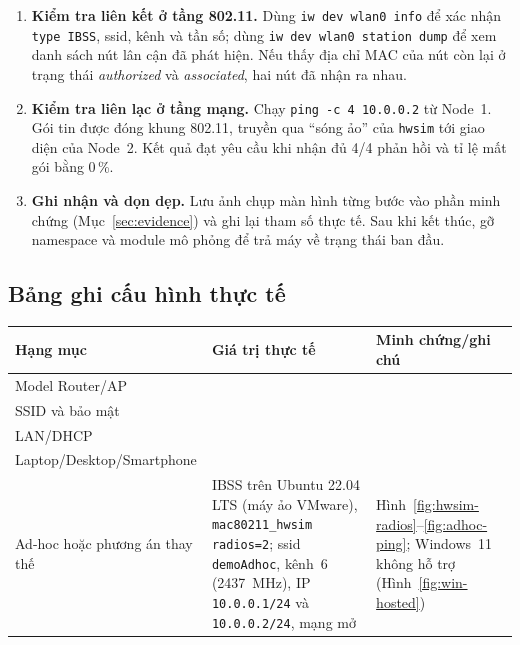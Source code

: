 \begin{enumerate}[leftmargin=*]
  \item \textbf{Kiểm tra liên kết ở tầng 802.11.} Dùng
    \texttt{iw dev wlan0 info} để xác nhận \texttt{type IBSS}, \ac{ssid},
    kênh và tần số; dùng \texttt{iw dev wlan0 station dump} để xem danh sách nút
    lân cận đã phát hiện. Nếu thấy địa chỉ MAC của nút còn lại ở trạng thái
    \emph{authorized} và \emph{associated}, hai nút đã nhận ra nhau.

  \item \textbf{Kiểm tra liên lạc ở tầng mạng.} Chạy
    \texttt{ping -c 4 10.0.0.2} từ Node~1. Gói tin được đóng khung 802.11, truyền
    qua ``sóng ảo'' của \texttt{hwsim} tới giao diện của Node~2. Kết quả đạt yêu
    cầu khi nhận đủ 4/4 phản hồi và tỉ lệ mất gói bằng 0\,\%.

  \item \textbf{Ghi nhận và dọn dẹp.} Lưu ảnh chụp màn hình từng bước vào phần
    minh chứng (Mục~\ref{sec:evidence}) và ghi lại tham số thực tế. Sau khi kết
    thúc, gỡ namespace và module mô phỏng để trả máy về trạng thái ban đầu.
\end{enumerate}

\subsection{Bảng ghi cấu hình thực tế}
\begin{center}
\begin{tabularx}{\linewidth}{X X X}
  \toprule
  Hạng mục & Giá trị thực tế & Minh chứng/ghi chú \\
  \midrule
  Model Router/AP & & \\
  SSID và bảo mật & & \\
  LAN/DHCP & & \\
  Laptop/Desktop/Smartphone & & \\
  Ad-hoc hoặc phương án thay thế & IBSS trên Ubuntu 22.04 LTS (máy ảo
    VMware), \texttt{mac80211\_hwsim radios=2}; \ac{ssid} \texttt{demoAdhoc},
    kênh~6 (2437~MHz), IP \texttt{10.0.0.1/24} và \texttt{10.0.0.2/24}, mạng mở
    & Hình~\ref{fig:hwsim-radios}--\ref{fig:adhoc-ping}; Windows~11 không hỗ trợ
    (Hình~\ref{fig:win-hosted}) \\
  \bottomrule
\end{tabularx}
\end{center}
